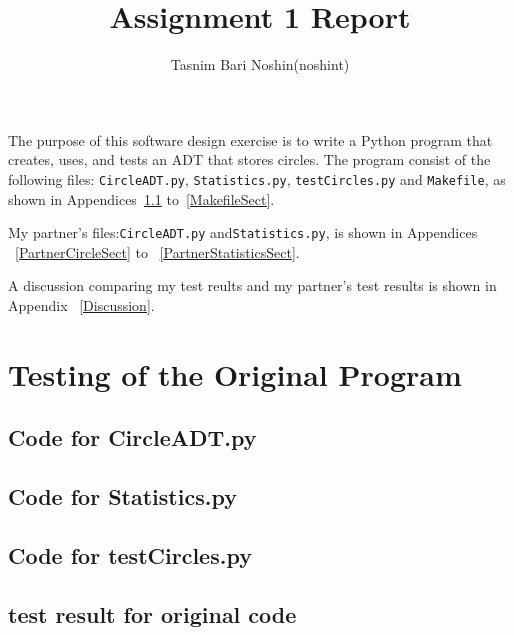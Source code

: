 \documentclass[12pt]{article}
\title{Assignment 1 Report}
\author{Tasnim Bari Noshin(noshint)}
\begin{document}
\maketitle

The purpose of this software design exercise is to write a Python program that
creates, uses, and tests an ADT that stores circles.  The program consist of the
following files: {\tt CircleADT.py}, {\tt Statistics.py}, {\tt testCircles.py}
and {\tt Makefile}, as shown in Appendices~\ref{CircleSect} to~\ref{MakefileSect}.

My partner's files:{\tt CircleADT.py} and{\tt Statistics.py}, is shown in Appendices ~\ref{PartnerCircleSect} to ~\ref{PartnerStatisticsSect}.

A discussion comparing my test reults and my partner's test results is shown in Appendix ~\ref{Discussion}.

\newpage

\section{Testing of the Original Program}

\lstset{language=Python, basicstyle=\tiny,breaklines=true,showspaces=false,showstringspaces=false,breakatwhitespace=true}


\subsection{Code for CircleADT.py} \label{CircleSect}

\noindent 

\newpage

\subsection{Code for Statistics.py} \label{StatisticsSect}

\noindent 

\newpage

\subsection{Code for testCircles.py} \label{testSect}

\noindent 

\newpage

\subsection{test result for original code} \label{ResultSect}
\end{document}
